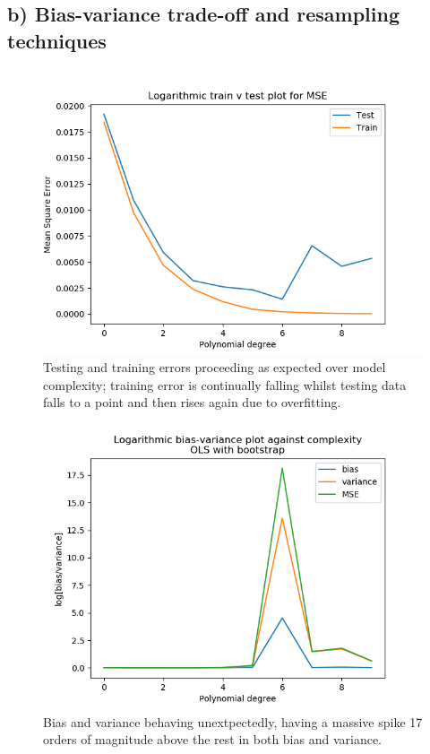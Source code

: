 \documentclass[a4paper, UKenglish]{article}
\newcommand{\0}{\mathbf{0}}
\newcommand{\1}{\mathbf{1}}
\begin{document}
\subsection{b) Bias-variance trade-off and resampling techniques}
\begin{figure}[H]
        \centering 
        \includegraphics[scale=0.75]{../outputs/images/partB/trainTestMSE.png} 
        \caption{Testing and training errors proceeding as expected over model complexity; training error is continually falling whilst testing data falls to a point and then rises again due to overfitting.}
        \label{fig:trainTestMSE}
\end{figure}
\begin{figure}[H]
        \centering 
        \includegraphics[scale=0.75]{../outputs/images/partB/biasVariance.png} 
        \caption{Bias and variance behaving unextpectedly, having a massive spike 17 orders of magnitude above the rest in both bias and variance.}
        \label{fig:biasVariance}
\end{figure}
\end{document}
